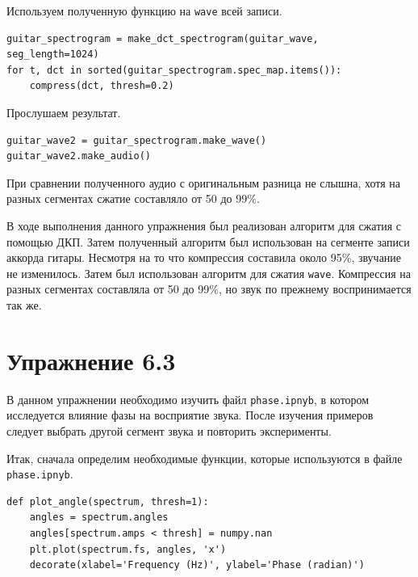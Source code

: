 \documentclass[a4paper, 14pt]{extarticle}
\begin{document}
    Используем полученную функцию на \texttt{wave} всей записи.

    \begin{lstlisting}[caption= Сжатие \texttt{wave} всей записи., label={lst:task2_fun2}]
guitar_spectrogram = make_dct_spectrogram(guitar_wave, seg_length=1024)
for t, dct in sorted(guitar_spectrogram.spec_map.items()):
    compress(dct, thresh=0.2)   \end{lstlisting}

    Прослушаем результат.

    \begin{lstlisting}[caption= Получение аудио результата., label={lst:task2_fun2}]
guitar_wave2 = guitar_spectrogram.make_wave()
guitar_wave2.make_audio()   \end{lstlisting}

    При сравнении полученного аудио с оригинальным разница не слышна, хотя на разных сегментах сжатие составляло от 50
    до 99\%.

    В ходе выполнения данного упражнения был реализован алгоритм для сжатия с помощью ДКП.
    Затем полученный алгоритм был использован на сегменте записи аккорда гитары. Несмотря на то что компрессия составила
    около 95\%, звучание не изменилось. Затем был использован алгоритм для сжатия \texttt{wave}.
    Компрессия на разных сегментах составляла от 50 до 99\%, но звук по прежнему воспринимается так же.

    \newpage

    \section{Упражнение 6.3}
    \label{sec:task3}

    В данном упражнении необходимо изучить файл \texttt{phase.ipnyb}, в котором исследуется влияние фазы на восприятие
    звука. После изучения примеров следует выбрать другой сегмент звука и повторить эксперименты.

    Итак, сначала определим необходимые функции, которые используются в файле \texttt{phase.ipnyb}.

    \begin{lstlisting}[caption= Функция \texttt{plot\_angle}., label={lst:task3_plot_angle}]
def plot_angle(spectrum, thresh=1):
    angles = spectrum.angles
    angles[spectrum.amps < thresh] = numpy.nan
    plt.plot(spectrum.fs, angles, 'x')
    decorate(xlabel='Frequency (Hz)', ylabel='Phase (radian)')  \end{lstlisting}
\end{document}
